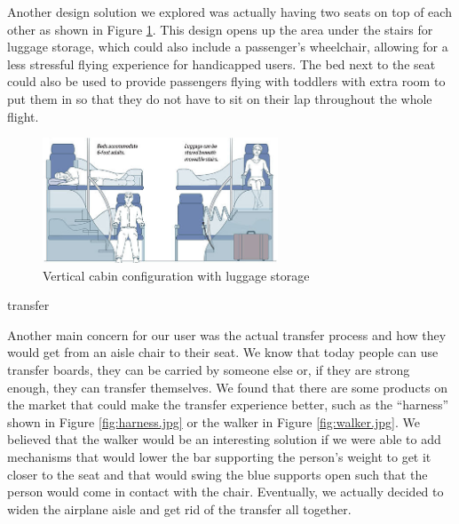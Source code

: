 Another design solution we explored was actually having two seats on top of each other as shown in Figure \ref{fig:vertical_with_luggage.jpg}. This design opens up the area under the stairs for luggage storage, which could also include a passenger’s wheelchair, allowing for a less stressful flying experience for handicapped users. The bed next to the seat could also be used to provide passengers flying with toddlers with extra room to put them in so that they do not have to sit on their lap throughout the whole flight. 

\begin{figure}[h]
  \centering
     \includegraphics[width=7cm]{images/vertical_with_luggage.jpg}
   \caption{Vertical cabin configuration with luggage storage \cite{vertical_luggage}}%
  \label{fig:vertical_with_luggage.jpg}
\end{figure} 
transfer

Another main concern for our user was the actual transfer process and how they would get from an aisle chair to their seat. We know that today people can use transfer boards, they can be carried by someone else or, if they are strong enough, they can transfer themselves. We found that there are some products on the market that could make the transfer experience better, such as the “harness” shown in Figure \ref{fig:harness.jpg} or the walker in Figure \ref{fig:walker.jpg}. We believed that the walker would be an interesting solution if we were able to add mechanisms  that would lower the bar supporting the person’s weight to get it closer to the seat and that would swing the blue supports open such that the person would come in contact with the chair. Eventually, we actually decided to widen the airplane aisle and get rid of the transfer all together. 

